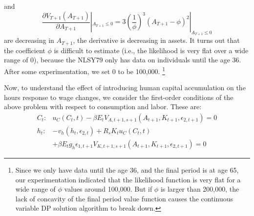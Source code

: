 \documentclass[\econtexRoot/ImaiKeane]{subfiles}
\begin{document}
{           and
            \begin{equation*}
             \dfrac{\partial V_{T+1} (A_{T+1})}{\partial A_{T+1}}|_{A_{T+1} \leq 0} = 3 (\frac{1}{\phi})^3(A_{T+1}-\phi)^2|_{A_{T+1} \leq 0}
           \end{equation*}
           are decreasing in $A_{T+1}$, the derivative is decreasing in assets.
         } It turns out that the coefficient $\phi$ is difficult to estimate (i.e., the likelihood is very flat over a wide range of 0), because the NLSY79 only has data on individuals until the age 36. After some experimentation, we set 0 to be 100,000. \footnote[8]{Since we only have data until the age 36, and the final period is at age 65, our experimentation indicated that the likelihood function is very flat for a wide range of $\phi$ values around 100,000. But if $\phi$ is larger than 200,000, the lack of concavity of the final period value function causes the continuous variable DP solution algorithm to break down.} \par
         Now, to understand the effect of introducing human capital accumulation on the hours response to wage changes, we consider the first-order conditions of the above problem with respect to consumption and labor. These are:
         \begin{equation} \tag{9}
           \label{eq:FOC}
           \begin{split}
             C_t: &  u_C(C_t,t) - \beta E_t V_{A,t+1,s+1}(A_{t+1},K_{t+1},\epsilon_{2,t+1}) = 0 \\
             h_t: & -v_h(h_t,\epsilon_{2,t}) + R_sK_t u_C(C_t,t) \\
             & + \beta E_t g_h \epsilon_{1,t+1} V_{K,t+1,s+1}(A_{t+1},K_{t+1},\epsilon_{2,t+1})=0
           \end{split}
           \end{equation}
          
\end{document}
